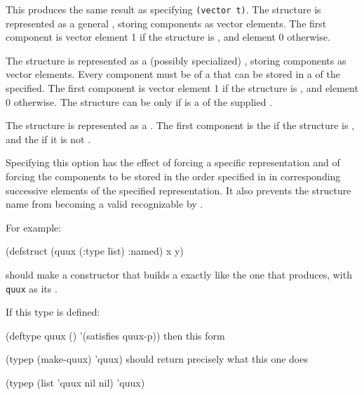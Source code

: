 \beginlist

This produces the same result as specifying {\tt (vector t)}.
The structure is represented
as a general , storing components as vector elements.
The first component is vector 
element 1 if the structure is , and element 0 otherwise.



The structure is represented as a (possibly specialized) , storing
components as vector elements.  Every component must be of a  
that can be stored in a  of the  specified.  
The first component is vector
element 1 if the structure is , and element 0 otherwise.
The structure can be  only if  
is a  of the supplied .



The structure is represented as a .
The first component is the  if the structure is ,
and the  if it is not .
\endlist                           

Specifying this option has the effect of forcing
a specific representation and of forcing the components to be
stored in the order specified in  
in corresponding successive elements of the specified representation.
It also prevents the structure name from becoming a valid
 recognizable by .

For example:

\code
 (defstruct (quux (:type list) :named) x y)
\endcode

should make a constructor that builds a  exactly like the one
that  produces, 
with {\tt quux} as its .
 
If this type is defined:
 
\code
 (deftype quux () '(satisfies quux-p))
\endcode
then this form
 
\code
 (typep (make-quux) 'quux)
\endcode
should return precisely what this one does
 
\code
 (typep (list 'quux nil nil) 'quux)
\endcode


